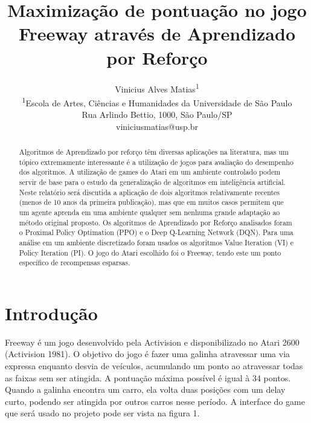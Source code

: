 \documentclass[letterpaper]{article} %
\title{Maximização de pontuação no jogo Freeway através de Aprendizado por Reforço}
\author{Vinicius Alves Matias\textsuperscript{\rm 1} \\ 
\textsuperscript{\rm 1}Escola de Artes, Ciências e Humanidades da Universidade de São Paulo\\ %
Rua Arlindo Bettio, 1000, São Paulo/SP\\
viniciusmatias@usp.br %
}
\begin{document}
\maketitle

\begin{abstract}
Algoritmos de Aprendizado por reforço têm diversas aplicações na literatura, mas um tópico extremamente interessante é a utilização de jogos para avaliação do desempenho dos algoritmos. A utilização de games do  Atari em um ambiente controlado podem servir de base para o estudo da generalização de algoritmos em inteligência artificial. Neste relatório será discutida a aplicação de dois algoritmos relativamente recentes (menos de 10 anos da primeira publicação), mas que em muitos casos permitem que um agente aprenda em uma ambiente qualquer sem nenhuma grande adaptação ao método original proposto. Os algoritmos de Aprendizado por Reforço analisados foram o Proximal Policy Optimation (PPO) e o Deep Q-Learning Network (DQN). Para uma análise em um ambiente discretizado foram usados os algoritmos Value Iteration (VI) e Policy Iteration (PI). O jogo do Atari escolhido foi o Freeway, tendo este um ponto específico de recompensas esparsas. 
\end{abstract}

\section{Introdução}
Freeway é um jogo desenvolvido pela Activision e disponibilizado no Atari 2600 (Activision 1981). O objetivo do jogo é fazer uma galinha atravessar uma via expressa enquanto desvia de veículos, acumulando um ponto ao atravessar todas as faixas sem ser atingida. A pontuação máxima possível é igual à 34 pontos. Quando a galinha encontra um carro, ela volta duas posições com um delay curto, podendo ser atingida por outros carros nesse período. A interface do game que será usado no projeto pode ser vista na figura 1.
\end{document}
